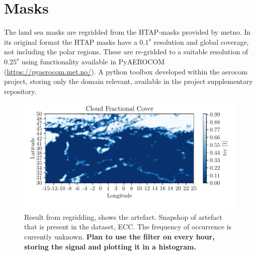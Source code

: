 \section{Masks} \label{sec:mask}
The land sea masks are regridded from the HTAP-masks provided by \acrfull{metno}.  In its original format the HTAP masks have a $0.1^o$ resolution and global coverage, not including the polar regions. These are re-gridded to a suitable resolution of $0.25^o$ using functionality available in PyAEROCOM (\href{https://pyaerocom.met.no/}{https://pyaerocom.met.no/}). A python toolbox developed within the \acrfull{aerocom} project, storing only the domain relevant, available in the project supplementary repository. 
\begin{figure}
    \centering
    \includegraphics{python_figs/example_artefact.pdf}
    \caption[Artefact in European Cloud Cover dataset.]{Result from regridding, shows the artefact. Snapshop of artefact that is present in the dataset, ECC. The frequency of occurrence is currently unknown. \textbf{Plan to use the filter on every hour, storing the signal and plotting it in a histogram.}}
    \label{fig:example_artefact}
\end{figure}
